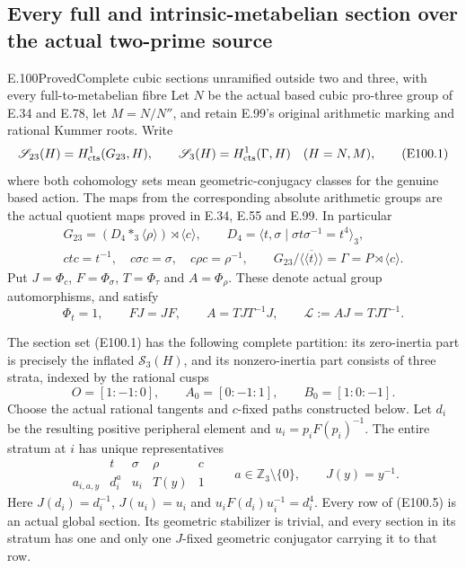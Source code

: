 \subsection{Every full and intrinsic-metabelian section over the actual two-prime source}

\begin{statement}{E.100}{Proved}{Complete cubic sections unramified outside two and three, with every full-to-metabelian fibre}
Let $N$ be the actual based cubic pro-three group of E.34 and
E.78, let $M=N/N''$, and retain E.99's original arithmetic
marking and rational Kummer roots. Write
\[
 \mathscr S_{23}(H)=H^1_{\rm cts}(G_{23},H),\qquad
 \mathscr S_3(H)=H^1_{\rm cts}(\Gamma,H)
       \quad(H=N,M),
 \tag{E100.1}
\]
where both cohomology sets mean geometric-conjugacy classes
for the genuine based action. The maps from the corresponding
absolute arithmetic groups are the actual quotient maps
proved in E.34, E.55 and E.99. In particular
\[
\begin{gathered}
 G_{23}=(D_4\mathop{*}_3\langle\rho\rangle)
                   \rtimes\langle c\rangle,\qquad
 D_4=\langle t,\sigma\mid\sigma t\sigma^{-1}=t^4\rangle_3,\\
 ctc=t^{-1},\quad c\sigma c=\sigma,\quad
 c\rho c=\rho^{-1},\qquad
 G_{23}/\overline{\langle\!\langle t\rangle\!\rangle}
        =\Gamma=P\rtimes\langle c\rangle .
\end{gathered}
 \tag{E100.2}
\]
Put $J=\Phi_c$, $F=\Phi_\sigma$, $T=\Phi_\tau$ and
$A=\Phi_\rho$. These denote actual group automorphisms,
and satisfy
\[
 \Phi_t=1,\qquad FJ=JF,\qquad
 A=TJT^{-1}J,\qquad \mathcal L:=AJ=TJT^{-1}.
 \tag{E100.3}
\]

The section set (E100.1) has the following complete partition:
its zero-inertia part is precisely the inflated
$\mathscr S_3(H)$, and its nonzero-inertia part consists of
three strata, indexed by the rational cusps
\[
 O=[1:-1:0],\qquad A_0=[0:-1:1],\qquad B_0=[1:0:-1].
 \tag{E100.4}
\]
Choose the actual rational tangents and $c$-fixed paths
constructed below. Let $d_i$ be the resulting positive
peripheral element and
$u_i=p_iF(p_i)^{-1}$. The entire stratum at $i$ has unique
representatives
\[
\begin{array}{c|cccc}
     &t&\sigma&\rho&c\\ \hline
 a_{i,a,y}&d_i^a&u_i&T(y)&1
\end{array}
 \qquad
 a\in\mathbb Z_3\setminus\{0\},\qquad J(y)=y^{-1}.
 \tag{E100.5}
\]
Here $J(d_i)=d_i^{-1}$, $J(u_i)=u_i$ and
$u_iF(d_i)u_i^{-1}=d_i^4$. Every row of (E100.5)
is an actual global section. Its geometric stabilizer
is trivial, and every section in its stratum has one
and only one $J$-fixed geometric conjugator carrying
it to that row.


\end{statement}

